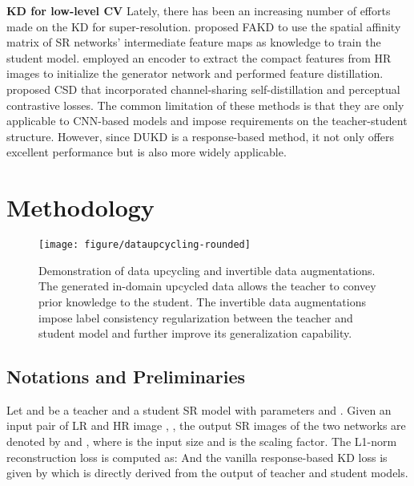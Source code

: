 \documentclass[10pt,twocolumn,letterpaper]{article}
\begin{document}
\noindent\textbf{KD for low-level CV}
Lately, there has been an increasing number of efforts made on the KD for super-resolution. 
\citet{he2020fakd} proposed FAKD to use the spatial affinity matrix of SR networks' intermediate feature maps as knowledge to train the student model. \citet{lee2020learning} employed an encoder to extract the compact features from HR images to initialize the generator network and performed feature distillation. \citet{wang2021towards} proposed CSD that incorporated channel-sharing self-distillation and perceptual contrastive losses.
The common limitation of these methods is that they are only applicable to CNN-based models and impose requirements on the teacher-student structure. However, since DUKD is a response-based method, it not only offers excellent performance but is also more widely applicable. \section{Methodology}\label{sec: dukd}
\begin{figure*}  \vspace{-5mm}
	\centering
	\texttt{[image: figure/dataupcycling-rounded]}\vspace{-0.5em}
	\caption{Demonstration of data upcycling and invertible data augmentations. The generated in-domain upcycled data allows the teacher to convey prior knowledge to the student. The invertible data augmentations impose label consistency regularization between the teacher and student model and further improve its generalization capability.}
	\label{fig:methods}\vspace{-1.4em}
\end{figure*}

\subsection{Notations and Preliminaries}
Let  and  be a teacher and a student SR model with parameters  and . Given an input pair of LR and HR image , , the output SR images of the two networks are denoted by  and , where  is the input size and  is the scaling factor.
The L1-norm reconstruction loss is computed as:
\vspace{-0.25em}
And the vanilla response-based KD loss is given by
\vspace{-0.25em}
which is directly derived from the output of teacher and student models. 
\end{document}
